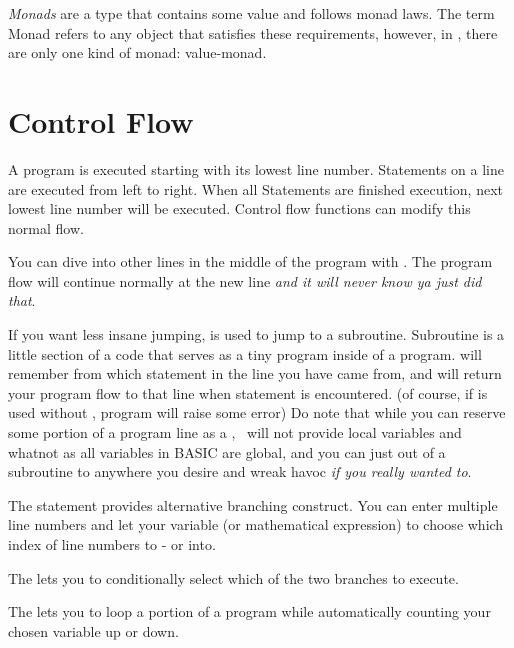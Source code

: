 \emph{Monads} are a type that contains some value and follows monad laws. The term Monad refers to any object that satisfies these requirements, however, in \tbas, there are only one kind of monad: value-monad.

\section{Control Flow}

A program is executed starting with its lowest line number. Statements on a line are executed from left to right. When all Statements are finished execution, next lowest line number will be executed. Control flow functions can modify this normal flow.

You can dive into other lines in the middle of the program with . The program flow will continue normally at the new line \emph{and it will never know ya just did that}.

If you want less insane jumping,  is used to jump to a subroutine. Subroutine is a little section of a code that serves as a tiny program inside of a program.  will remember from which statement in the line you have came from, and will return your program flow to that line when  statement is encountered. (of course, if  is used without , program will raise some error) Do note that while you can reserve some portion of a program line as a , \tbas\ will not provide local variables and whatnot as all variables in BASIC are global, and you can just  out of a subroutine to anywhere you desire and wreak havoc \emph{if you really wanted to}.

The  statement provides alternative branching construct. You can enter multiple line numbers and let your variable (or mathematical expression) to choose which index of line numbers to - or  into.

The  lets you to conditionally select which of the two branches to execute.

The  lets you to loop a portion of a program while automatically counting your chosen variable up or down.
